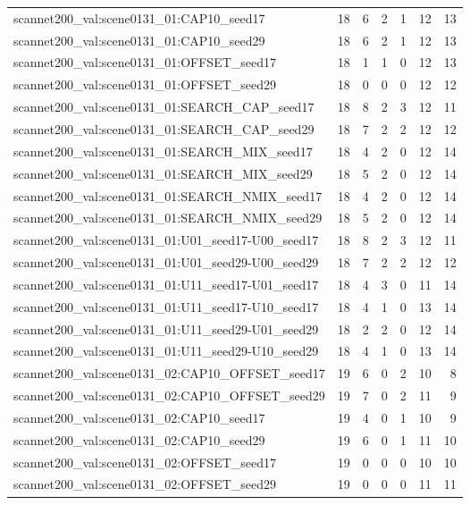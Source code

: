 \begin{table}[t]
\begin{tabular}{lrrrrrr}
scannet200\_val:scene0131\_01:CAP10\_seed17 & 18 & 6 & 2 & 1 & 12 & 13 \\
scannet200\_val:scene0131\_01:CAP10\_seed29 & 18 & 6 & 2 & 1 & 12 & 13 \\
scannet200\_val:scene0131\_01:OFFSET\_seed17 & 18 & 1 & 1 & 0 & 12 & 13 \\
scannet200\_val:scene0131\_01:OFFSET\_seed29 & 18 & 0 & 0 & 0 & 12 & 12 \\
scannet200\_val:scene0131\_01:SEARCH\_CAP\_seed17 & 18 & 8 & 2 & 3 & 12 & 11 \\
scannet200\_val:scene0131\_01:SEARCH\_CAP\_seed29 & 18 & 7 & 2 & 2 & 12 & 12 \\
scannet200\_val:scene0131\_01:SEARCH\_MIX\_seed17 & 18 & 4 & 2 & 0 & 12 & 14 \\
scannet200\_val:scene0131\_01:SEARCH\_MIX\_seed29 & 18 & 5 & 2 & 0 & 12 & 14 \\
scannet200\_val:scene0131\_01:SEARCH\_NMIX\_seed17 & 18 & 4 & 2 & 0 & 12 & 14 \\
scannet200\_val:scene0131\_01:SEARCH\_NMIX\_seed29 & 18 & 5 & 2 & 0 & 12 & 14 \\
scannet200\_val:scene0131\_01:U01\_seed17-U00\_seed17 & 18 & 8 & 2 & 3 & 12 & 11 \\
scannet200\_val:scene0131\_01:U01\_seed29-U00\_seed29 & 18 & 7 & 2 & 2 & 12 & 12 \\
scannet200\_val:scene0131\_01:U11\_seed17-U01\_seed17 & 18 & 4 & 3 & 0 & 11 & 14 \\
scannet200\_val:scene0131\_01:U11\_seed17-U10\_seed17 & 18 & 4 & 1 & 0 & 13 & 14 \\
scannet200\_val:scene0131\_01:U11\_seed29-U01\_seed29 & 18 & 2 & 2 & 0 & 12 & 14 \\
scannet200\_val:scene0131\_01:U11\_seed29-U10\_seed29 & 18 & 4 & 1 & 0 & 13 & 14 \\
scannet200\_val:scene0131\_02:CAP10\_OFFSET\_seed17 & 19 & 6 & 0 & 2 & 10 & 8 \\
scannet200\_val:scene0131\_02:CAP10\_OFFSET\_seed29 & 19 & 7 & 0 & 2 & 11 & 9 \\
scannet200\_val:scene0131\_02:CAP10\_seed17 & 19 & 4 & 0 & 1 & 10 & 9 \\
scannet200\_val:scene0131\_02:CAP10\_seed29 & 19 & 6 & 0 & 1 & 11 & 10 \\
scannet200\_val:scene0131\_02:OFFSET\_seed17 & 19 & 0 & 0 & 0 & 10 & 10 \\
scannet200\_val:scene0131\_02:OFFSET\_seed29 & 19 & 0 & 0 & 0 & 11 & 11 \\

\end{tabular}
\end{table}
